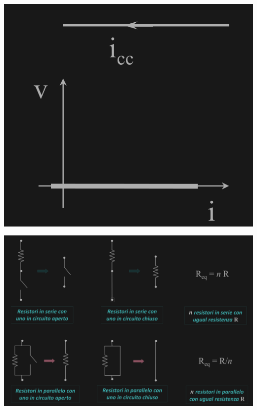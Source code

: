 \documentclass{article}
\begin{document}
\begin{center}
    \includegraphics[scale=0.23]{Image/Circuito chiuso.png}
\end{center}
\begin{center}
    \includegraphics[scale=0.3]{Image/Resistori aperto chiuso.png}
\end{center}
\end{document}
